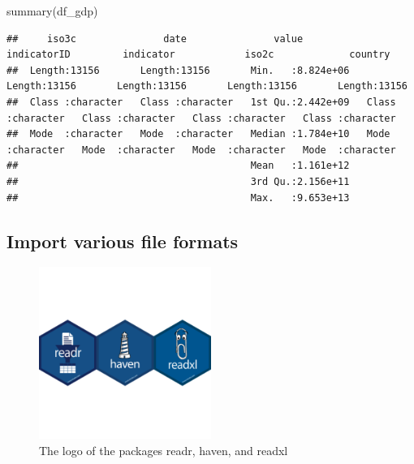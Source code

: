 \documentclass[
  12pt,
  oneside]{book}
\newenvironment{Shaded}{\begin{snugshade}}{\end{snugshade}}
\newcommand{\FunctionTok}[1]{\textcolor[rgb]{0.00,0.00,0.00}{#1}}
\newcommand{\NormalTok}[1]{#1}
\theoremstyle{definition}
\theoremstyle{definition}
\theoremstyle{definition}
\theoremstyle{definition}
\theoremstyle{remark}
\begin{document}
\begin{Shaded}
\begin{Highlighting}[]
\FunctionTok{summary}\NormalTok{(df\_gdp)}
\end{Highlighting}
\end{Shaded}

\begin{verbatim}
##     iso3c               date               value           indicatorID         indicator            iso2c             country         
##  Length:13156       Length:13156       Min.   :8.824e+06   Length:13156       Length:13156       Length:13156       Length:13156      
##  Class :character   Class :character   1st Qu.:2.442e+09   Class :character   Class :character   Class :character   Class :character  
##  Mode  :character   Mode  :character   Median :1.784e+10   Mode  :character   Mode  :character   Mode  :character   Mode  :character  
##                                        Mean   :1.161e+12                                                                              
##                                        3rd Qu.:2.156e+11                                                                              
##                                        Max.   :9.653e+13
\end{verbatim}

\hypertarget{import-various-file-formats}{%
\subsection{Import various file formats}\label{import-various-file-formats}}

\begin{figure}
\centering
\includegraphics[width=0.5\textwidth,height=\textheight]{fig/import-logo.png}
\caption{\label{fig:import-logo} The logo of the packages readr, haven, and readxl}
\end{figure}
\end{document}
